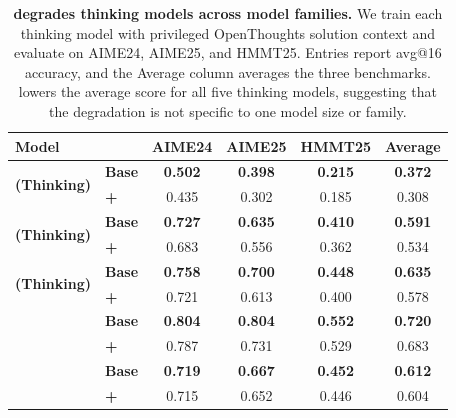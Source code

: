 \begin{table}[t]
\centering
\caption{\textbf{\opsd{} degrades thinking models across model families.}
We train each thinking model with privileged OpenThoughts solution context and evaluate on AIME24, AIME25, and HMMT25. Entries report avg@16 accuracy, and the Average column averages the three benchmarks. \opsd{} lowers the average score for all five thinking models, suggesting that the degradation is not specific to one model size or family.}
\label{tab:openthoughts_thinking_models}
\small
\setlength{\tabcolsep}{5pt}
\renewcommand{\arraystretch}{1.15}

\newcommand{\metrichead}[1]{%
  \textbf{#1}%
}

\begin{tabular*}{\textwidth}{@{\extracolsep{\fill}}llcccc@{}}
\toprule
\textbf{Model}
&
& \metrichead{AIME24}
& \metrichead{AIME25}
& \metrichead{HMMT25}
& \metrichead{Average} \\
\midrule

\multirow{2}{*}{\textbf{\qwenonesevenb{} (Thinking)}}
& \textbf{Base}
& \textbf{0.502}
& \textbf{0.398}
& \textbf{0.215}
& \textbf{0.372} \\
&
\textbf{+\opsd{}}
& 0.435
& 0.302
& 0.185
& 0.308 \\
\midrule

\multirow{2}{*}{\textbf{\qwenfourb{} (Thinking)}}
& \textbf{Base}
& \textbf{0.727}
& \textbf{0.635}
& \textbf{0.410}
& \textbf{0.591} \\
&
\textbf{+\opsd{}}
& 0.683
& 0.556
& 0.362
& 0.534 \\
\midrule

\multirow{2}{*}{\textbf{\qweneightb{} (Thinking)}}
& \textbf{Base}
& \textbf{0.758}
& \textbf{0.700}
& \textbf{0.448}
& \textbf{0.635} \\
&
\textbf{+\opsd{}}
& 0.721
& 0.613
& 0.400
& 0.578 \\
\midrule

\multirow{2}{*}{\textbf{\qwenfourbthink{}}}
& \textbf{Base}
& \textbf{0.804}
& \textbf{0.804}
& \textbf{0.552}
& \textbf{0.720} \\
&
\textbf{+\opsd{}}
& 0.787
& 0.731
& 0.529
& 0.683 \\
\midrule

\multirow{2}{*}{\textbf{\olmosevenbthink{}}}
& \textbf{Base}
& \textbf{0.719}
& \textbf{0.667}
& \textbf{0.452}
& \textbf{0.612} \\
&
\textbf{+\opsd{}}
& 0.715
& 0.652
& 0.446
& 0.604 \\

\bottomrule
\end{tabular*}
\end{table}

